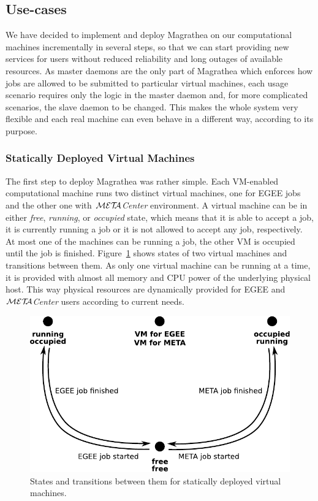\documentclass{sigplanconf}
\def\META#1{\textit{${\cal MET\!\!A}$#1}}
\begin{document}
\subsection{Use-cases}

We have decided to implement and deploy Magrathea on our computational
machines incrementally in several steps, so that we can start providing new
services for users without reduced reliability and long outages of available
resources. As master daemons are the only part of Magrathea which enforces how
jobs are allowed to be submitted to particular virtual machines, each usage
scenario requires only the logic in the master daemon and, for more
complicated scenarios, the slave daemon to be changed. This makes the whole
system very flexible and each real machine can even behave in a different way,
according to its purpose.

\subsubsection{Statically Deployed Virtual Machines}

The first step to deploy Magrathea was rather simple. Each VM-enabled
computational machine runs two distinct virtual machines, one for EGEE jobs
and the other one with \META{Center} environment. A virtual machine can be in
either \textit{free}, \textit{running}, or \textit{occupied} state, which
means that it is able to accept a job, it is currently running a job or it is
not allowed to accept any job, respectively. At most one of the machines can
be running a job, the other VM is occupied until the job is finished.
Figure~\ref{fig:twoVMs} shows states of two virtual machines and transitions
between them. As only one virtual machine can be running at a time, it is
provided with almost all memory and CPU power of the underlying physical host.
This way physical resources are dynamically provided for EGEE and
\META{Center} users according to current needs. 

\begin{figure}[tb]
    \includegraphics[width=\columnwidth]{twoVMs}
    \caption{States and transitions between them for statically deployed
        virtual machines.}
    \label{fig:twoVMs}
\end{figure}
\end{document}
